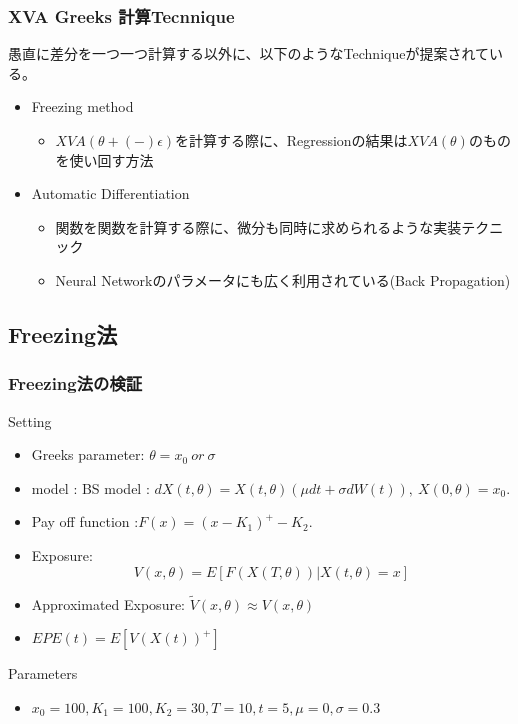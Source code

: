 \documentclass[driverfallback=dvipdfmx,cjk]{beamer}
\begin{document}
\begin{frame}\frametitle{XVA Greeks 計算Tecnnique}
愚直に差分を一つ一つ計算する以外に、以下のようなTechniqueが提案されている。
\begin{itemize}
    \item Freezing method
        \begin{itemize}
            \item $XVA(\theta +(-) \epsilon)$を計算する際に、Regressionの結果は$XVA(\theta)$のものを使い回す方法
        \end{itemize}
    \item Automatic Differentiation
        \begin{itemize}
            \item 関数を関数を計算する際に、微分も同時に求められるような実装テクニック
            \item Neural Networkのパラメータにも広く利用されている(Back Propagation)
        \end{itemize}
\end{itemize}
\end{frame}

\subsection{Freezing法}
\begin{frame}\frametitle{Freezing法の検証 }
    Setting
    \begin{itemize}
        \item Greeks parameter: $\theta = x_0 \  or  \ \sigma$
        \item model : BS model :  $d X(t,\theta) = X(t,\theta) ( \mu dt + \sigma dW(t)), \ X(0,\theta) = x_0.$
        \item Pay off function :$ F(x) = (x - K_1)^+  - K_2. $
        \item Exposure: $$ V(x, \theta) = E[F(X(T, \theta)) |X(t, \theta) = x] $$
        \item Approximated Exposure:  $\tilde{V}(x, \theta)\approx V(x, \theta)$
        \item $EPE(t) = E[V(X(t))^+] $
    \end{itemize}
    Parameters
    \begin{itemize}
        \item $x_0=100, K_1=100, K_2 = 30, T = 10, t = 5, \mu=0, \sigma=0.3$
    \end{itemize}
\end{frame}
\end{document}
